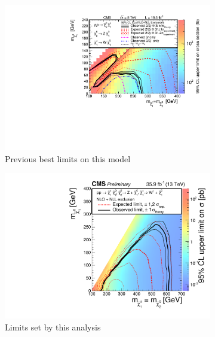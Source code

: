     \begin{figure}[!h]
      \centering
        \begin{subfigure}[b]{0.4\textwidth}
          \label{fig:t5zz_interpretations_2015}
          \includegraphics[width=\textwidth]{figures/interpretations/TChiWZ_previous_best.pdf}
          \caption{Previous best limits on this model}
        \end{subfigure}
        \begin{subfigure}[b]{0.4\textwidth}
          \label{fig:t5zz_interpretations_current}
          \includegraphics[width=\textwidth]{figures/interpretations/TChiWZ_Exclusion_13TeV.pdf}
          \caption{Limits set by this analysis}
        \end{subfigure}
      \caption[The limits set on the electroweak WZ model.]{ \label{fig:tchiwz_interpretation}
}
\end{figure}
